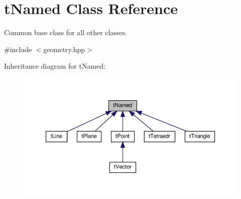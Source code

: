 \hypertarget{classtNamed}{}\section{t\+Named Class Reference}
\label{classtNamed}


Common base class for all other classes.  




{\ttfamily \#include $<$geometry.\+hpp$>$}



Inheritance diagram for t\+Named\+:
\nopagebreak
\begin{figure}[H]
\begin{center}
\leavevmode
\includegraphics[width=350pt]{classtNamed__inherit__graph}
\end{center}
\end{figure}
